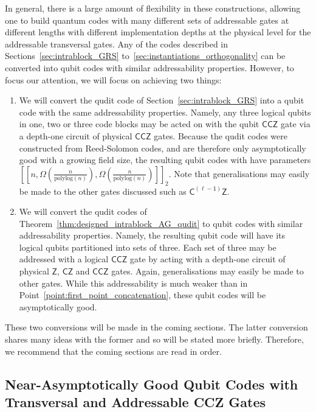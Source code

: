 \documentclass[11pt]{article}
\theoremstyle{definition}
\newcommand{\CCZ}{\mathsf{CCZ}}
\newcommand{\CLZ}{\mathsf{C^{(\ell-1)}Z}}
\begin{document}
In general, there is a large amount of flexibility in these constructions, allowing one to build quantum codes with many different sets of addressable gates at different lengths with different implementation depths at the physical level for the addressable transversal gates. Any of the codes described in Sections~\ref{sec:intrablock_GRS} to~\ref{sec:instantiations_orthogonality} can be converted into qubit codes with similar addressability properties. However, to focus our attention, we will focus on achieving two things:
\begin{enumerate}
    \item \label{point:first_point_concatenation} We will convert the qudit code of Section~\ref{sec:intrablock_GRS} into a qubit code with the same addressability properties. Namely, any three logical qubits in one, two or three code blocks may be acted on with the qubit $\CCZ$ gate via a depth-one circuit of physical $\CCZ$ gates. Because the qudit codes were constructed from Reed-Solomon codes, and are therefore only asymptotically good with a growing field size, the resulting qubit codes with have parameters $\left[\left[n,\Omega\left(\frac{n}{\text{polylog}(n)}\right),\Omega\left(\frac{n}{\text{polylog}(n)}\right)\right]\right]_2$. Note that generalisations may easily be made to the other gates discussed such as $\CLZ$.
    \item We will convert the qudit codes of Theorem~\ref{thm:designed_intrablock_AG_qudit} to qubit codes with similar addressability properties. Namely, the resulting qubit code will have its logical qubits partitioned into sets of three. Each set of three may be addressed with a logical $\CCZ$ gate by acting with a depth-one circuit of physical $\mathsf{Z}$, $\mathsf{CZ}$ and $\mathsf{CCZ}$ gates. Again, generalisations may easily be made to other gates. While this addressability is much weaker than in Point~\ref{point:first_point_concatenation}, these qubit codes will be asymptotically good.
\end{enumerate}
These two conversions will be made in the coming sections. The latter conversion shares many ideas with the former and so will be stated more briefly. Therefore, we recommend that the coming sections are read in order.


\subsection{Near-Asymptotically Good Qubit Codes with Transversal and Addressable CCZ Gates}\label{sec:near_asymp_good_concatenation}
\end{document}
